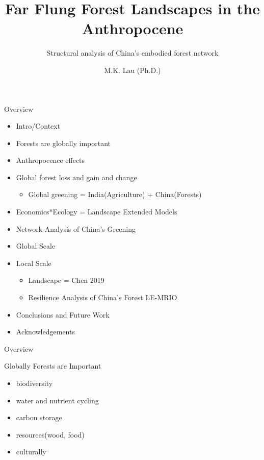 \documentclass[ignorenonframetext,]{beamer}
\title{Far Flung Forest Landscapes in the Anthropocene}
\subtitle{Structural analysis of China's embodied forest network}
\author{M.K. Lau (Ph.D.)}
\date{}
\providecommand{\tightlist}{%
  \setlength{\itemsep}{0pt}\setlength{\parskip}{0pt}}
\begin{document}
\frame{\titlepage}

\begin{frame}{Overview}

\begin{itemize}
\tightlist
\item
  Intro/Context
\item
  Forests are globally important
\item
  Anthropocence effects
\item
  Global forest loss and gain and change

  \begin{itemize}
  \tightlist
  \item
    Global greening = India(Agriculture) + China(Forests)
  \end{itemize}
\item
  Economics*Ecology = Landscape Extended Models
\item
  Network Analysis of China's Greening
\item
  Global Scale
\item
  Local Scale

  \begin{itemize}
  \tightlist
  \item
    Landscape = Chen 2019
  \item
    Resilience Analysis of China's Forest LE-MRIO
  \end{itemize}
\item
  Conclusions and Future Work
\item
  Acknowledgements
\end{itemize}

\end{frame}

\begin{frame}{Overview}

\end{frame}

\begin{frame}{Globally Forests are Important}

\begin{itemize}
\tightlist
\item
  biodiversity
\item
  water and nutrient cycling
\item
  carbon storage
\item
  resources(wood, food)
\item
  culturally
\end{itemize}

\end{frame}
\end{document}
